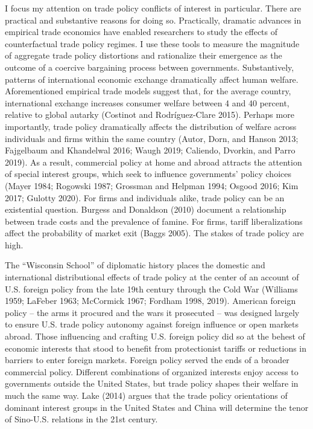\documentclass{puthesis}
\begin{document}
I focus my attention on trade policy conflicts of interest in
particular. There are practical and substantive reasons for doing so.
Practically, dramatic advances in empirical trade economics have enabled
researchers to study the effects of counterfactual trade policy regimes.
I use these tools to measure the magnitude of aggregate trade policy
distortions and rationalize their emergence as the outcome of a coercive
bargaining process between governments. Substantively, patterns of
international economic exchange dramatically affect human welfare.
Aforementioned empirical trade models suggest that, for the average
country, international exchange increases consumer welfare between 4 and
40 percent, relative to global autarky (Costinot and Rodríguez-Clare
2015). Perhaps more importantly, trade policy dramatically affects the
distribution of welfare across individuals and firms within the same
country (Autor, Dorn, and Hanson 2013; Fajgelbaum and Khandelwal 2016;
Waugh 2019; Caliendo, Dvorkin, and Parro 2019). As a result, commercial
policy at home and abroad attracts the attention of special interest
groups, which seek to influence governments' policy choices (Mayer 1984;
Rogowski 1987; Grossman and Helpman 1994; Osgood 2016; Kim 2017; Gulotty
2020). For firms and individuals alike, trade policy can be an
existential question. Burgess and Donaldson (2010) document a
relationship between trade costs and the prevalence of famine. For
firms, tariff liberalizations affect the probability of market exit
(Baggs 2005). The stakes of trade policy are high.

The ``Wisconsin School'' of diplomatic history places the domestic and
international distributional effects of trade policy at the center of an
account of U.S. foreign policy from the late 19th century through the
Cold War (Williams 1959; LaFeber 1963; McCormick 1967; Fordham 1998,
2019). American foreign policy -- the arms it procured and the wars it
prosecuted -- was designed largely to ensure U.S. trade policy autonomy
against foreign influence or open markets abroad. Those influencing and
crafting U.S. foreign policy did so at the behest of economic interests
that stood to benefit from protectionist tariffs or reductions in
barriers to enter foreign markets. Foreign policy served the ends of a
broader commercial policy. Different combinations of organized interests
enjoy access to governments outside the United States, but trade policy
shapes their welfare in much the same way. Lake (2014) argues that the
trade policy orientations of dominant interest groups in the United
States and China will determine the tenor of Sino-U.S. relations in the
21st century.
\end{document}
